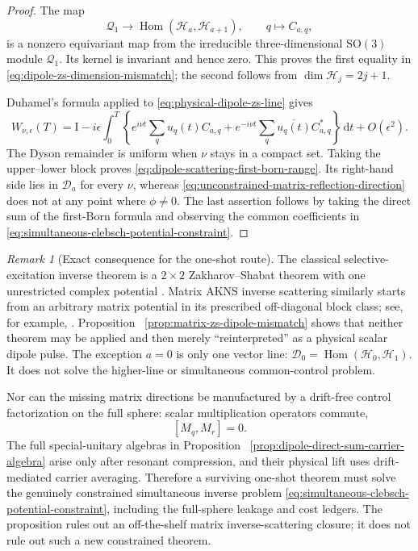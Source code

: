 \documentclass[11pt]{article}
\theoremstyle{remark}
\newtheorem{remark}[theorem]{Remark}
\newcommand{\Id}{\mathrm I}
\newcommand{\dd}{\,\mathrm d}
\begin{document}
\begin{proof}
The map
\[
 \mathcal Q_1\longrightarrow
 \operatorname{Hom}(\mathcal H_a,\mathcal H_{a+1}),
 \qquad q\longmapsto C_{a,q},
\]
is a nonzero equivariant map from the irreducible three-dimensional
$\mathrm{SO}(3)$ module $\mathcal Q_1$.  Its kernel is invariant and hence
zero.  This proves the first equality in
\eqref{eq:dipole-zs-dimension-mismatch}; the second follows from
$\dim\mathcal H_j=2j+1$.

Duhamel's formula applied to
\eqref{eq:physical-dipole-zs-line} gives
\[
 W_{\nu,\epsilon}(T)
 =\Id-i\epsilon\int_0^T
 \left\{
 e^{i\nu t}\sum_q u_q(t)C_{a,q}
 +e^{-i\nu t}\sum_q\overline{u_q(t)}C_{a,q}^*
 \right\}\dd t
 +O(\epsilon^2).
\]
The Dyson remainder is uniform when $\nu$ stays in a compact set.  Taking
the upper--lower block proves
\eqref{eq:dipole-scattering-first-born-range}.  Its right-hand side lies in
$\mathcal D_a$ for every $\nu$, whereas
\eqref{eq:unconstrained-matrix-reflection-direction} does not at any point
where $\phi\neq0$.  The last assertion follows by taking the direct sum of
the first-Born formula and observing the common coefficients in
\eqref{eq:simultaneous-clebsch-potential-constraint}.
\end{proof}

\begin{remark}[Exact consequence for the one-shot route]
\label{rem:matrix-zs-not-physical-lift}
The classical selective-excitation inverse theorem is a $2\times2$
Zakharov--Shabat theorem with one unrestricted complex potential
\cite{Magland2009}.  Matrix AKNS inverse scattering similarly starts from an
arbitrary matrix potential in its prescribed off-diagonal block class; see,
for example, \cite{VanDerMee2025}.  Proposition
~\ref{prop:matrix-zs-dipole-mismatch} shows that neither theorem may be
applied and then merely ``reinterpreted'' as a physical scalar dipole pulse.
The exception $a=0$ is only one vector line:
$\mathcal D_0=\operatorname{Hom}(\mathcal H_0,\mathcal H_1)$.  It does not
solve the higher-line or simultaneous common-control problem.

Nor can the missing matrix directions be manufactured by a drift-free
control factorization on the full sphere: scalar multiplication operators
commute,
\[
 [M_q,M_r]=0.
\]
The full special-unitary algebras in Proposition
~\ref{prop:dipole-direct-sum-carrier-algebra} arise only after resonant
compression, and their physical lift uses drift-mediated carrier averaging.
Therefore a surviving one-shot theorem must solve the genuinely constrained
simultaneous inverse problem
\eqref{eq:simultaneous-clebsch-potential-constraint}, including the
full-sphere leakage and cost ledgers.  The proposition rules out an
off-the-shelf matrix inverse-scattering closure; it does not rule out such a
new constrained theorem.
\end{remark}
\end{document}
